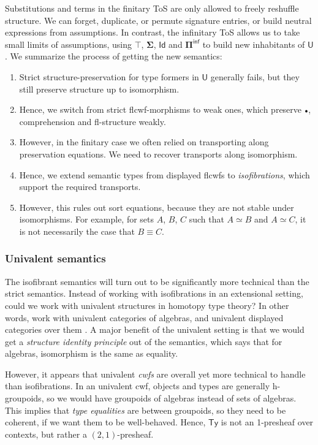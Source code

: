 \documentclass[12pt,a4paper,twoside,openany]{book}
\theoremstyle{remark}
\theoremstyle{definition}
\theoremstyle{theorem}
\newcommand{\bs}[1]{\boldsymbol{#1}}
\newcommand{\Ty}{\mathsf{Ty}}
\newcommand{\U}{\mathsf{U}}
\newcommand{\Id}{\mathsf{Id}}
\newcommand{\emptycon}{\scaleobj{.75}\bullet}
\newcommand{\Piinf}{\Pi^{\mathsf{inf}}}
\newcommand{\bU}{\bs{\U}}
\begin{document}
Substitutions and terms in the finitary ToS are only allowed to freely reshuffle
structure. We can forget, duplicate, or permute signature entries, or build
neutral expressions from assumptions. In contrast, the infinitary ToS allows us
to take small limits of assumptions, using $\bs{\top}$, $\bs{\Sigma}$, $\bs{\Id}$ and $\bs{\Piinf}$
to build new inhabitants of $\bU$. We summarize the process of getting the new
semantics:
\begin{enumerate}
\item Strict structure-preservation for type formers in $\bU$ generally fails, but they still
      preserve structure up to isomorphism.
\item Hence, we switch from strict flcwf-morphisms to weak ones, which preserve $\emptycon$, comprehension
      and fl-structure weakly.
\item However, in the finitary case we often relied on transporting along
      preservation equations. We need to recover transports along isomorphism.
\item Hence, we extend semantic types from displayed flcwfs to \emph{isofibrations}, which
      support the required transports.
\item However, this rules out sort equations, because they are not stable under
      isomorphisms. For example, for sets $A$, $B$, $C$ such that $A \simeq B$ and
      $A \simeq C$, it is not necessarily the case that $B \equiv C$.
\end{enumerate}

\subsubsection{Univalent semantics}

The isofibrant semantics will turn out to be significantly more technical than
the strict semantics. Instead of working with isofibrations in an extensional
setting, could we work with univalent structures in homotopy type theory? In
other words, work with univalent categories of algebras, and univalent displayed
categories over them \cite{displayedcats}. A major benefit of the univalent
setting is that we would get a \emph{structure identity principle}
\cite{aczel2011voevodsky} out of the semantics, which says that for algebras,
isomorphism is the same as equality.

However, it appears that univalent \emph{cwfs} are overall yet more technical to
handle than isofibrations. In an univalent cwf, objects and types are generally
h-groupoids, so we would have groupoids of algebras instead of sets of
algebras. This implies that \emph{type equalities} are between groupoids, so
they need to be coherent, if we want them to be well-behaved. Hence, $\Ty$ is
not an 1-presheaf over contexts, but rather a $(2,1)$-presheaf.
\end{document}
